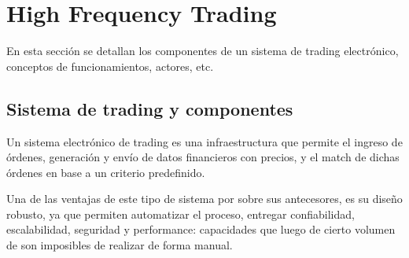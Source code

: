 

\section{High Frequency Trading}

En esta sección se detallan los componentes de un sistema de trading
electrónico, conceptos de funcionamientos, actores, etc.

\subsection{Sistema de trading y componentes}
Un sistema electrónico de trading es una infraestructura que permite el ingreso
de órdenes, generación y envío de datos financieros con precios, y el match de
dichas órdenes en base a un criterio predefinido.

Una de las ventajas de este tipo de sistema por sobre sus antecesores, es su
diseño robusto, ya que permiten automatizar el proceso, entregar confiabilidad,
escalabilidad, seguridad y performance: capacidades que luego de cierto volumen
de son imposibles de realizar de forma manual.

